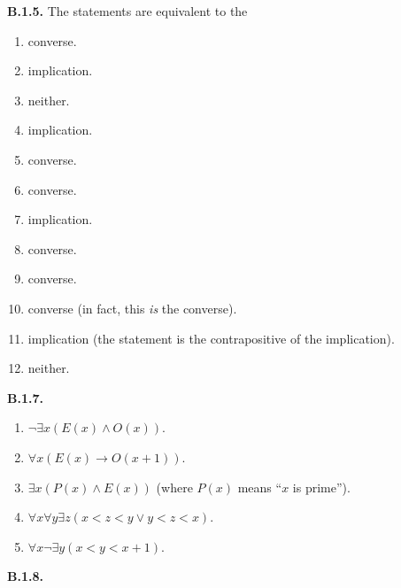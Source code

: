 \documentclass[10pt,]{book}
\theoremstyle{plain}
\theoremstyle{definition}
\theoremstyle{definition}
\theoremstyle{definition}
\theoremstyle{definition}
\numberwithin{equation}{chapter}
\def\imp{\rightarrow}
\newcommand{\lt}{<}
\begin{document}
%
\par\smallskip
\noindent\textbf{B.1.5.} \hypertarget{p-1400}{}%
The statements are equivalent to the\textellipsis{} \leavevmode%
\begin{enumerate}[label=(\alph*)]
\item\hypertarget{li-369}{}\hypertarget{p-1401}{}%
converse.%
\item\hypertarget{li-370}{}\hypertarget{p-1402}{}%
implication.%
\item\hypertarget{li-371}{}\hypertarget{p-1403}{}%
neither.%
\item\hypertarget{li-372}{}\hypertarget{p-1404}{}%
implication.%
\item\hypertarget{li-373}{}\hypertarget{p-1405}{}%
converse.%
\item\hypertarget{li-374}{}\hypertarget{p-1406}{}%
converse.%
\item\hypertarget{li-375}{}\hypertarget{p-1407}{}%
implication.%
\item\hypertarget{li-376}{}\hypertarget{p-1408}{}%
converse.%
\item\hypertarget{li-377}{}\hypertarget{p-1409}{}%
converse.%
\item\hypertarget{li-378}{}\hypertarget{p-1410}{}%
converse (in fact, this \emph{is} the converse).%
\item\hypertarget{li-379}{}\hypertarget{p-1411}{}%
implication (the statement is the contrapositive of the implication).%
\item\hypertarget{li-380}{}\hypertarget{p-1412}{}%
neither.%
\end{enumerate}
%
\par\smallskip
\noindent\textbf{B.1.7.} \hypertarget{p-1421}{}%
\leavevmode%
\begin{enumerate}[label=(\alph*)]
\item\hypertarget{li-386}{}\(\neg \exists x (E(x) \wedge O(x))\).%
\item\hypertarget{li-387}{}\(\forall x (E(x) \imp O(x+1))\).%
\item\hypertarget{li-388}{}\(\exists x(P(x) \wedge E(x))\) (where \(P(x)\) means ``\(x\) is prime'').%
\item\hypertarget{li-389}{}\(\forall x \forall y \exists z(x \lt  z \lt  y \vee y \lt  z \lt  x)\).%
\item\hypertarget{li-390}{}\(\forall x \neg \exists y (x \lt  y \lt  x+1)\).%
\end{enumerate}
%
\par\smallskip
\noindent\textbf{B.1.8.} \hypertarget{p-1423}{}%
\leavevmode%
\end{document}
